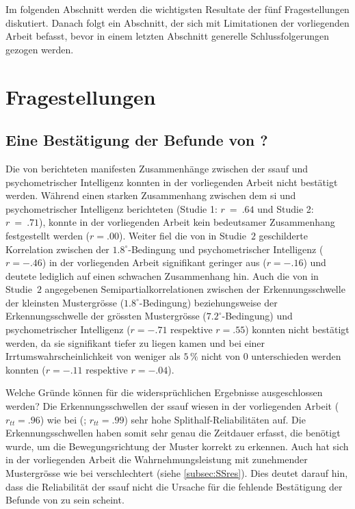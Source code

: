 \documentclass[11pt, twoside, a4paper]{book}		%
\begin{document}
Im folgenden Abschnitt werden die wichtigsten Resultate der fünf Fragestellungen diskutiert. Danach folgt ein Abschnitt, der sich mit Limitationen der vorliegenden Arbeit befasst, bevor in einem letzten Abschnitt generelle Schlussfolgerungen gezogen werden.

\section{Fragestellungen}

\subsection{Eine Bestätigung der Befunde von \citet{Melnick2013}?}

Die von \citeauthor{Melnick2013} berichteten manifesten Zusammenhänge zwischen der \gls{ssauf} und psychometrischer Intelligenz konnten in der vorliegenden Arbeit nicht bestätigt werden.
Während \citeauthor{Melnick2013} einen starken Zusammenhang zwischen dem \gls{si} und psychometrischer Intelligenz berichteten (Studie 1: $r~=~.64$ und Studie 2: $r~=~.71$), konnte in der vorliegenden Arbeit kein bedeutsamer Zusammenhang festgestellt werden ($r=.00$). 
Weiter fiel die von \citeauthor{Melnick2013} in Studie~$2$ geschilderte Korrelation zwischen der $1.8^{\circ}$-Bedingung und psychometrischer Intelligenz ($r=-.46$) in der vorliegenden Arbeit signifikant geringer aus ($r=-.16$) und deutete lediglich auf einen schwachen Zusammenhang hin.
Auch die von \citeauthor{Melnick2013} in Studie~$2$ angegebenen Semipartialkorrelationen zwischen der Erkennungsschwelle der kleinsten Mustergrösse ($1.8^{\circ}$-Bedingung) beziehungsweise der Erkennungsschwelle der grössten Mustergrösse ($7.2^{\circ}$-Bedingung) und psychometrischer Intelligenz ($r=-.71$ respektive $r=.55$) konnten nicht bestätigt werden, da sie signifikant tiefer zu liegen kamen und bei einer Irrtumswahrscheinlichkeit von weniger als $5\,\%$ nicht von $0$ unterschieden werden konnten ($r=-.11$ respektive $r=-.04$).

Welche Gründe können für die widersprüchlichen Ergebnisse ausgeschlossen werden?
Die Erkennungsschwellen der \gls{ssauf} wiesen in der vorliegenden Arbeit ($r_{tt} = .96$) wie bei \citeauthor{Melnick2013} (\citeyear{Melnick2013}; $r_{tt} = .99$) sehr hohe Splithalf-Reliabilitäten auf. Die Erkennungsschwellen haben somit sehr genau die Zeitdauer erfasst, die benötigt wurde, um die Bewegungsrichtung der Muster korrekt zu erkennen. Auch hat sich in der vorliegenden Arbeit die Wahrnehmungsleistung mit zunehmender Mustergrösse wie bei \citeauthor{Melnick2013} verschlechtert (siehe \autoref{subsec:SSres}). Dies deutet darauf hin, dass die Reliabilität der \gls{ssauf} nicht die Ursache für die fehlende Bestätigung der Befunde von \citeauthor{Melnick2013} zu sein scheint.
\end{document}

